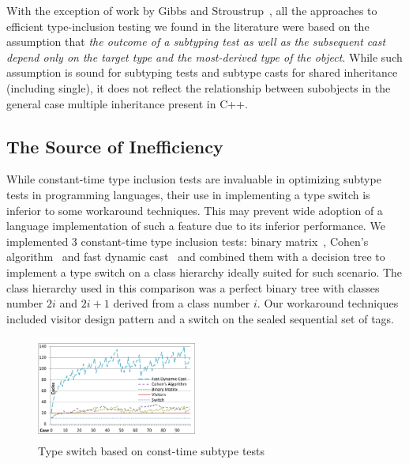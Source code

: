 With the exception of work by Gibbs and Stroustrup~\cite{FastDynCast}, all the 
approaches to efficient type-inclusion testing we found in the literature were 
based on the assumption that \emph{the outcome of a subtyping test as well as 
the subsequent cast depend only on the target type and the most-derived type of 
the object}. While such assumption is sound for subtyping tests and subtype 
casts for shared inheritance (including single), it does not reflect the 
relationship between subobjects in the general case multiple inheritance present 
in C++.

\subsection{The Source of Inefficiency}

While constant-time type inclusion tests are invaluable in optimizing subtype 
tests in programming languages, their use in implementing a type switch is 
inferior to some workaround techniques. This may prevent wide adoption of a 
language implementation of such a feature due to its inferior performance. 
We implemented 3 constant-time type inclusion tests: binary 
matrix~\cite{Vitek97}, Cohen's algorithm~\cite{Cohen91} and fast dynamic 
cast~\cite{FastDynCast} and combined them with a decision tree to implement a 
type switch on a class hierarchy ideally suited for such scenario.  
The class hierarchy used in this comparison was a perfect binary tree with 
classes number $2i$ and $2i+1$ derived from a class number $i$. Our workaround 
techniques included visitor design pattern and a switch on the sealed sequential 
set of tags.

\begin{figure}[htbp]
  \centering
    \includegraphics[width=0.47\textwidth]{DCast-vs-Visitors.pdf}
  \caption{Type switch based on const-time subtype tests}
  \label{fig:DCastVis2}
\end{figure}

